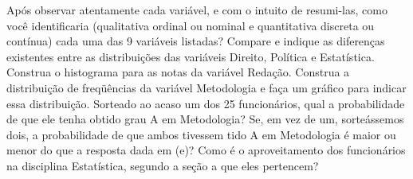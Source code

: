 \documentclass{report}
\begin{document}
\begin{Exercise}
\begin{tasks}
\task Após observar atentamente cada variável, e com o intuito de resumi-las, como você
identificaria (qualitativa ordinal ou nominal e quantitativa discreta ou contínua) cada
uma das 9 variáveis listadas?
\task Compare e indique as diferenças existentes entre as distribuições das variáveis Direito,
Política e Estatística.
\task Construa o histograma para as notas da variável Redação.
\task Construa a distribuição de freqüências da variável Metodologia e faça um gráfico
para indicar essa distribuição.
\task Sorteado ao acaso um dos 25 funcionários, qual a probabilidade de que ele tenha
obtido grau A em Metodologia?
\task Se, em vez de um, sorteássemos dois, a probabilidade de que ambos tivessem tido A
em Metodologia é maior ou menor do que a resposta dada em (e)?
\task Como é o aproveitamento dos funcionários na disciplina Estatística, segundo a seção
a que eles pertencem?
\end{tasks}


\end{Exercise}
\end{document}

